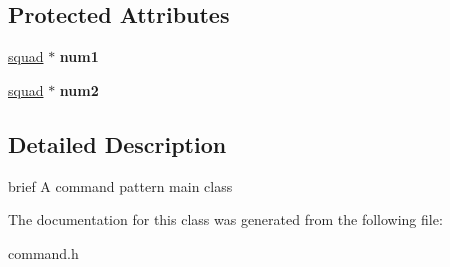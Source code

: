 \subsection*{Protected Attributes}
\begin{DoxyCompactItemize}
\item 
\mbox{\label{classcommand_a30a3ade7522d7b33716ac27fb50412a1}} 
\mbox{\hyperlink{classsquad}{squad}} $\ast$ {\bfseries num1}
\item 
\mbox{\label{classcommand_a4cac3d92834e0f4fc1cad5ffb54755d6}} 
\mbox{\hyperlink{classsquad}{squad}} $\ast$ {\bfseries num2}
\end{DoxyCompactItemize}


\subsection{Detailed Description}
brief A command pattern main class 

The documentation for this class was generated from the following file\+:\begin{DoxyCompactItemize}
\item 
command.\+h\end{DoxyCompactItemize}
